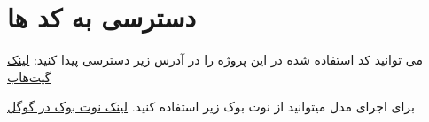 
\section{دسترسی به کد ها}\label{ap:codes}
می توانید کد استفاده شده در این پروژه را در آدرس زیر دسترسی پیدا کنید:
\href{https://github.com/soheilsalimidev/lo-fAi}{لینک گیت‌هاب}

برای اجرای مدل میتوانید از نوت‌ بوک زیر استفاده کنید.
\href{https://colab.research.google.com/drive/1mc6A0XWgNbJECqkoU0uCluzjcSxVfyuY?usp=sharing}{لینک نوت‌ بوک در گوگل }